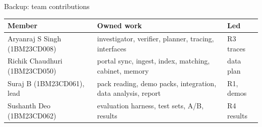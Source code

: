 \documentclass[aspectratio=169,11pt]{beamer}
\begin{document}
\begin{frame}{Backup: team contributions}
\small
\begin{tabularx}{\textwidth}{@{}l X l@{}}
\toprule
Member & Owned work & Led \\
\midrule
Aryanraj S Singh (1BM23CD008) & investigator, verifier, planner, tracing, interfaces & R3 traces \\
Richik Chaudhuri (1BM23CD050) & portal sync, ingest, index, matching, cabinet, memory & data plan \\
Suraj B (1BM23CD061), lead & pack reading, demo packs, integration, data analysis, report & R1, demos \\
Sushanth Deo (1BM23CD062) & evaluation harness, test sets, A/B, results & R4 results \\
\bottomrule
\end{tabularx}
\end{frame}
\end{document}
